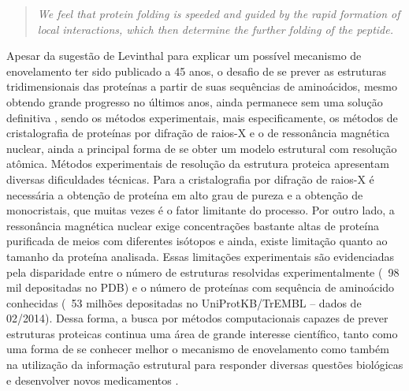 \begin{quote}
\textit{We feel that protein folding is speeded and guided by the rapid formation of local interactions, which then determine the further folding of the peptide.}
\end{quote}

Apesar da sugestão de Levinthal para explicar um possível mecanismo de enovelamento ter sido publicado a 45 anos, o desafio de se prever as estruturas tridimensionais das proteínas a partir de suas sequências de aminoácidos, mesmo obtendo grande progresso no últimos anos, ainda permanece sem uma solução definitiva \cite{Moult:2009}, sendo os métodos experimentais, mais especificamente, os métodos de cristalografia de proteínas por difração de raios-X e o de ressonância magnética nuclear, ainda a principal forma de se obter um modelo estrutural com resolução atômica. Métodos experimentais de resolução da estrutura proteica apresentam diversas dificuldades técnicas. Para a cristalografia por difração de raios-X é necessária a obtenção de proteína em alto grau de pureza e a obtenção de monocristais, que muitas vezes é o fator limitante do processo. Por outro lado, a ressonância magnética nuclear exige concentrações bastante altas de proteína purificada de meios com diferentes isótopos e ainda, existe limitação quanto ao tamanho da proteína analisada. Essas limitações experimentais são evidenciadas pela disparidade entre o número de estruturas resolvidas experimentalmente (~98 mil depositadas no PDB) e o número de proteínas com sequência de aminoácido conhecidas (~53 milhões depositadas no UniProtKB/TrEMBL – dados de 02/2014). Dessa forma, a busca por métodos computacionais capazes de prever estruturas proteicas continua uma área de grande interesse científico, tanto como uma forma de se conhecer melhor o mecanismo de enovelamento como também na utilização da informação estrutural para responder diversas questões biológicas e desenvolver novos medicamentos \cite{Baker:1996}.

